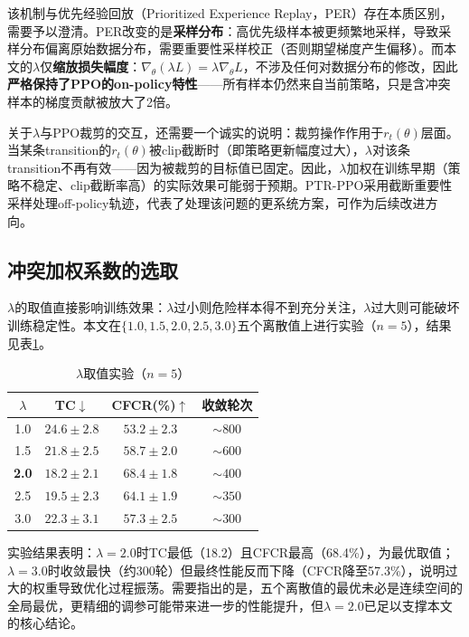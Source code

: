 \documentclass[12pt,a4paper,UTF8]{ctexbook}
\begin{document}
该机制与优先经验回放（Prioritized Experience Replay，PER）存在本质区别，需要予以澄清。PER改变的是\textbf{采样分布}：高优先级样本被更频繁地采样，导致采样分布偏离原始数据分布，需要重要性采样校正（否则期望梯度产生偏移）。而本文的$\lambda$仅\textbf{缩放损失幅度}：$\nabla_\theta(\lambda L)=\lambda\nabla_\theta L$，不涉及任何对数据分布的修改，因此\textbf{严格保持了PPO的on-policy特性}——所有样本仍然来自当前策略，只是含冲突样本的梯度贡献被放大了2倍。

关于$\lambda$与PPO裁剪的交互，还需要一个诚实的说明：裁剪操作作用于$r_t(\theta)$层面。当某条transition的$r_t(\theta)$被clip截断时（即策略更新幅度过大），$\lambda$对该条transition不再有效——因为被裁剪的目标值已固定。因此，$\lambda$加权在训练早期（策略不稳定、clip截断率高）的实际效果可能弱于预期。PTR-PPO\cite{ref27}采用截断重要性采样处理off-policy轨迹，代表了处理该问题的更系统方案，可作为后续改进方向。

\subsection{冲突加权系数的选取}

$\lambda$的取值直接影响训练效果：$\lambda$过小则危险样本得不到充分关注，$\lambda$过大则可能破坏训练稳定性。本文在$\{1.0, 1.5, 2.0, 2.5, 3.0\}$五个离散值上进行实验（$n=5$），结果见表\ref{tab:lambda}。

\begin{table}[H]
    \centering
    \caption{$\lambda$取值实验（$n=5$）}
    \label{tab:lambda}
    \begin{tabular}{|c|c|c|c|}
        \hline
        $\lambda$ & TC$\downarrow$ & CFCR(\%)$\uparrow$ & 收敛轮次 \\
        \hline
        1.0 & $24.6\pm2.8$ & $53.2\pm2.3$ & $\sim800$ \\
        1.5 & $21.8\pm2.5$ & $58.7\pm2.0$ & $\sim600$ \\
        \textbf{2.0} & $\mathbf{18.2\pm2.1}$ & $\mathbf{68.4\pm1.8}$ & $\sim400$ \\
        2.5 & $19.5\pm2.3$ & $64.1\pm1.9$ & $\sim350$ \\
        3.0 & $22.3\pm3.1$ & $57.3\pm2.5$ & $\sim300$ \\
        \hline
    \end{tabular}
\end{table}

实验结果表明：$\lambda=2.0$时TC最低（18.2）且CFCR最高（68.4\%），为最优取值；$\lambda=3.0$时收敛最快（约300轮）但最终性能反而下降（CFCR降至57.3\%），说明过大的权重导致优化过程振荡。需要指出的是，五个离散值的最优未必是连续空间的全局最优，更精细的调参可能带来进一步的性能提升，但$\lambda=2.0$已足以支撑本文的核心结论。
\end{document}
